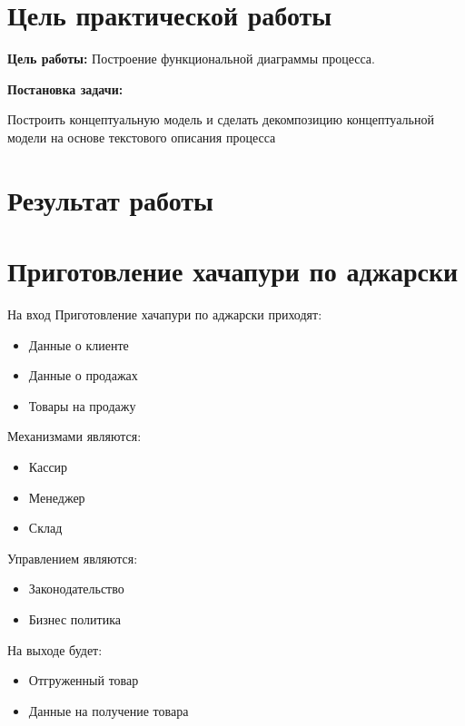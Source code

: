 
\section*{\LARGE Цель практической работы}

\textbf{Цель работы:} Построение функциональной диаграммы процесса.



\textbf{Постановка задачи:}\par
Построить концептуальную модель и сделать
декомпозицию концептуальной модели на основе текстового описания
процесса


\newpage

\section*{\LARGE Результат работы}

\section{Приготовление хачапури по аджарски}

На вход Приготовление хачапури по аджарски приходят:
\begin{itemize}
	\item Данные о клиенте
	\item Данные о продажах
	\item Товары на продажу
\end{itemize}

Механизмами являются:
\begin{itemize}
	\item Кассир
	\item Менеджер
	\item Склад
\end{itemize}

Управлением являются:
\begin{itemize}
	\item Законодательство
	\item Бизнес политика
\end{itemize}

На выходе будет:
\begin{itemize}
	\item Отгруженный товар
	\item Данные на получение товара
\end{itemize}

